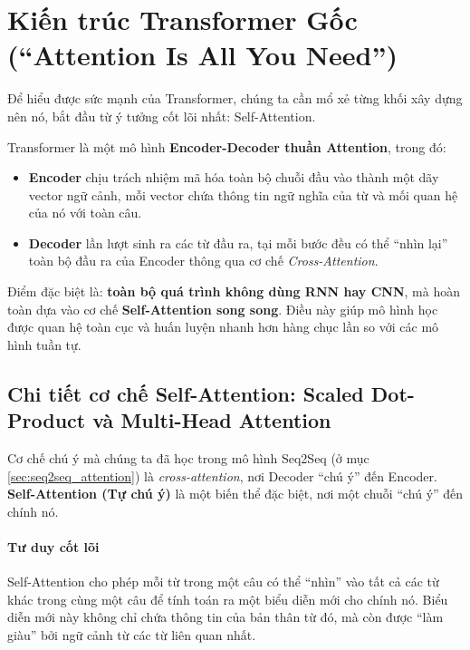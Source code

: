 
\section{Kiến trúc Transformer Gốc (“Attention Is All You Need”)}
\label{sec:vanilla_transformer}

Để hiểu được sức mạnh của Transformer, chúng ta cần mổ xẻ từng khối xây dựng nên nó, bắt đầu từ ý tưởng cốt lõi nhất: Self-Attention.

\begin{tcolorbox}[
	title={Tổng quan Kiến trúc Transformer},
	colback=blue!5!white, colframe=blue!60!black, fonttitle=\bfseries
	]
	Transformer là một mô hình \textbf{Encoder-Decoder thuần Attention}, trong đó:
	\begin{itemize}
		\item \textbf{Encoder} chịu trách nhiệm mã hóa toàn bộ chuỗi đầu vào thành một dãy vector ngữ cảnh, mỗi vector chứa thông tin ngữ nghĩa của từ và mối quan hệ của nó với toàn câu.
		\item \textbf{Decoder} lần lượt sinh ra các từ đầu ra, tại mỗi bước đều có thể “nhìn lại” toàn bộ đầu ra của Encoder thông qua cơ chế \textit{Cross-Attention}.
	\end{itemize}
	Điểm đặc biệt là: \textbf{toàn bộ quá trình không dùng RNN hay CNN}, mà hoàn toàn dựa vào cơ chế \textbf{Self-Attention song song}. Điều này giúp mô hình học được quan hệ toàn cục và huấn luyện nhanh hơn hàng chục lần so với các mô hình tuần tự.
\end{tcolorbox}

\subsection{Chi tiết cơ chế Self-Attention: Scaled Dot-Product và Multi-Head Attention}
\label{ssec:self_attention}

Cơ chế chú ý mà chúng ta đã học trong mô hình Seq2Seq (ở mục \ref{sec:seq2seq_attention}) là \textit{cross-attention}, nơi Decoder “chú ý” đến Encoder. \textbf{Self-Attention (Tự chú ý)} là một biến thể đặc biệt, nơi một chuỗi “chú ý” đến chính nó.

\paragraph{Tư duy cốt lõi}
Self-Attention cho phép mỗi từ trong một câu có thể “nhìn” vào tất cả các từ khác trong cùng một câu để tính toán ra một biểu diễn mới cho chính nó. Biểu diễn mới này không chỉ chứa thông tin của bản thân từ đó, mà còn được “làm giàu” bởi ngữ cảnh từ các từ liên quan nhất.


